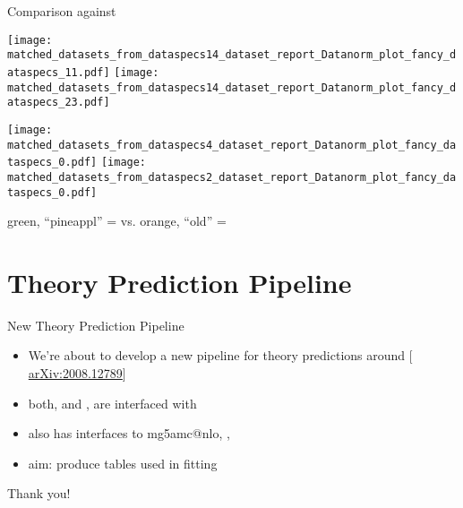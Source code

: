 \documentclass[10pt, usepdftitle=false]{beamer}
\makeatletter
\providecommand{\iRef}[1]{{\color{mLightGreen}\small $[$#1$]$}}
\newcommand\klammeraffe{@}
\makeatother
\begin{document}
\begin{frame}{Comparison \yadism{} against \apfel{}}
	\begin{center}
		\texttt{[image: matched\_datasets\_from\_dataspecs14\_dataset\_report\_Datanorm\_plot\_fancy\_dataspecs\_11.pdf]}%
		\quad%
		\texttt{[image: matched\_datasets\_from\_dataspecs14\_dataset\_report\_Datanorm\_plot\_fancy\_dataspecs\_23.pdf]}

		\texttt{[image: matched\_datasets\_from\_dataspecs4\_dataset\_report\_Datanorm\_plot\_fancy\_dataspecs\_0.pdf]}%
		\quad%
		\texttt{[image: matched\_datasets\_from\_dataspecs2\_dataset\_report\_Datanorm\_plot\_fancy\_dataspecs\_0.pdf]}

		{\color{vpGreen} green}, \enquote{pineappl} = \yadism{} vs. {\color{vpOrange} orange}, \enquote{old} = \apfel{}
	\end{center}
\end{frame}


\section{Theory Prediction Pipeline}

\begin{frame}{New Theory Prediction Pipeline}
	\begin{itemize}
		\item We're about to develop a new pipeline for theory predictions around \pineappl{} \iRef{\href{https://arxiv.org/abs/2008.12789}{arXiv:2008.12789}}
		\item both, \eko{} and \yadism{}, are interfaced with \pineappl{}
		\item \pineappl{} also has interfaces to {\abbrev mg5amc{\klammeraffe}nlo}, \appl{}, \fastnlo{}
		\item aim: produce \fk{} tables used in \pdf{} fitting
	\end{itemize}
\end{frame}


\begin{frame}[standout]
	Thank you!
\end{frame}

\appendix
\end{document}
